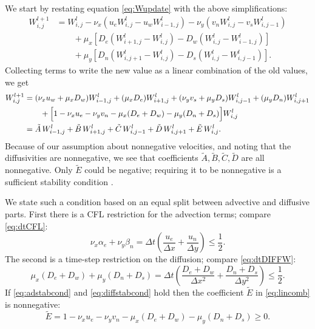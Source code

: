 \documentclass[11pt,final]{amsart}
\newcommand{\Wlij}{W^l_{i,j}}
\begin{document}
We start by restating equation \eqref{eq:Wupdate} with the above simplifications:
\begin{align*}
 W_{i,j}^{l+1} &= \Wlij - \nu_x \left(u_e \Wlij - u_w W_{i-1,j}^l\right) - \nu_y \left(v_n \Wlij - v_s W_{i,j-1}^l\right)  \\
      &\qquad + \mu_x \left[D_e \left(W_{i+1,j}^l - \Wlij\right) - D_w \left(\Wlij - W_{i-1,j}^l\right)\right]  \\
      &\qquad + \mu_y \left[D_n \left(W_{i,j+1}^l - \Wlij\right) - D_s \left(\Wlij - W_{i,j-1}^l\right)\right].
\end{align*}
Collecting terms to write the new value as a linear combination of the old values, we get
\begin{align}
 W_{i,j}^{l+1} &= (\nu_x u_w + \mu_x D_w) W_{i-1,j}^l + (\mu_x D_e) W_{i+1,j}^l + (\nu_y v_s + \mu_y D_s) W_{i,j-1}^l + (\mu_y D_n) W_{i,j+1}^l  \notag \\
      &\qquad + \Big[1 - \nu_x u_e - \nu_y v_n - \mu_x (D_e + D_w) - \mu_y (D_n + D_s)\Big] \Wlij \notag \\
  &= \tilde A\, W_{i-1,j}^l + \tilde B\, W_{i+1,j}^l + \tilde C\, W_{i,j-1}^l + \tilde D\, W_{i,j+1}^l + \tilde E\, \Wlij. \label{eq:lincomb}
\end{align}
Because of our assumption about nonnegative velocities, and noting that the diffusivities are nonnegative, we see that coefficients $\tilde A,\tilde B,\tilde C,\tilde D$ are all nonnegative.  Only $\tilde E$ could be negative; requiring it to be nonnegative is a sufficient stability condition \citep{MortonMayers}.

We state such a condition based on an equal split between advective and diffusive parts.  First there is a CFL restriction for the advection terms; compare \eqref{eq:dtCFL}:
\begin{equation}
\nu_x \alpha_e + \nu_y \beta_n = \Delta t \left(\frac{u_e}{\Delta x} + \frac{u_n}{\Delta y}\right) \le \frac{1}{2}. \label{eq:adstabcond}
\end{equation}
The second is a time-step restriction on the diffusion; compare \eqref{eq:dtDIFFW}:
\begin{equation}
\mu_x (D_e + D_w) + \mu_y (D_n + D_s) = \Delta t \left(\frac{D_e + D_w}{\Delta x^2} + \frac{D_n + D_s}{\Delta y^2}\right) \le \frac{1}{2}. \label{eq:diffstabcond}
\end{equation}
If \eqref{eq:adstabcond} and \eqref{eq:diffstabcond} hold then the coefficient $\tilde E$ in \eqref{eq:lincomb} is nonnegative:
	$$\tilde E = 1 - \nu_x u_e - \nu_y v_n - \mu_x (D_e + D_w) - \mu_y (D_n + D_s) \ge 0.$$
\end{document}
